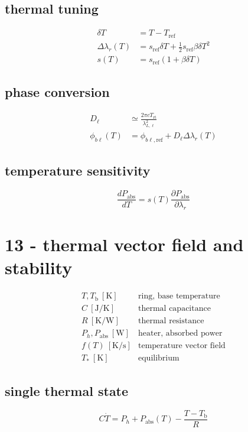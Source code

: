 \subsection*{thermal tuning}
\[
\displaystyle \begin{aligned}\delta T&=T-T_{\mathrm{ref}}\\\Delta\lambda_r(T)&=s_{\mathrm{ref}}\delta T+\tfrac12s_{\mathrm{ref}}\beta\delta T^2\\s(T)&=s_{\mathrm{ref}}(1+\beta\delta T)\end{aligned}
\]

\subsection*{phase conversion}
\[
\displaystyle \begin{aligned}D_\ell&\simeq\frac{2\pi cT_{\mathrm{rt}}}{\lambda_{L,\ell}^2}\\\phi_{b\ell}(T)&=\phi_{b\ell,\mathrm{ref}}+D_\ell\Delta\lambda_r(T)\end{aligned}
\]

\subsection*{temperature sensitivity}
\[
\displaystyle \frac{dP_{\mathrm{abs}}}{dT}=s(T)\frac{\partial P_{\mathrm{abs}}}{\partial\lambda_r}
\]

\clearpage
\section*{13 - thermal vector field and stability}

\[
\begin{array}{ll}T,T_{\mathrm b}\ [\mathrm K]&\text{ring, base temperature}\\[0.6em]C\ [\mathrm{J/K}]&\text{thermal capacitance}\\[0.6em]R\ [\mathrm{K/W}]&\text{thermal resistance}\\[0.6em]P_h,P_{\mathrm{abs}}\ [\mathrm W]&\text{heater, absorbed power}\\[0.6em]f(T)\ [\mathrm{K/s}]&\text{temperature vector field}\\[0.6em]T_*\ [\mathrm K]&\text{equilibrium}\end{array}
\]

\subsection*{single thermal state}
\[
\displaystyle C\dot T=P_h+P_{\mathrm{abs}}(T)-\frac{T-T_{\mathrm b}}R
\]

